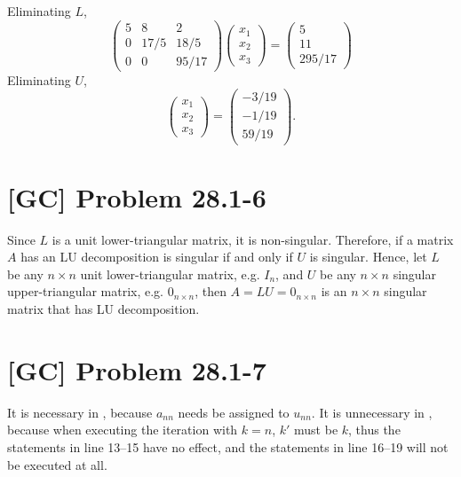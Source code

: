 \documentclass[a4paper,11pt]{article}
\begin{document}
  Eliminating $L$,
  $$ \begin{pmatrix}
       5 & 8 & 2 \\
       0 & 17/5 & 18/5 \\
       0 & 0 & 95/17
     \end{pmatrix}
     \begin{pmatrix} x_1 \\ x_2 \\ x_3 \end{pmatrix}
     =
     \begin{pmatrix} 5 \\ 11 \\ 295/17 \end{pmatrix} $$
  Eliminating $U$,
  $$ \begin{pmatrix} x_1 \\ x_2 \\ x_3 \end{pmatrix}
     =
     \begin{pmatrix} -3/19 \\ -1/19 \\ 59/19 \end{pmatrix}. $$

  \section{[GC] Problem 28.1-6}
  Since $L$ is a unit lower-triangular matrix, it is non-singular. Therefore, if a matrix $A$ has an LU decomposition is singular if and only if $U$ is singular. Hence, let $L$ be any $n \times n$ unit lower-triangular matrix, e.g. $I_n$, and $U$ be any $n \times n$ singular upper-triangular matrix, e.g. $0_{n \times n}$, then $A=LU=0_{n \times n}$ is an $n \times n$ singular matrix that has LU decomposition.

  \section{[GC] Problem 28.1-7}
  It is necessary in , because $a_{nn}$ needs be assigned to $u_{nn}$.
  It is unnecessary in , because when executing the \For iteration with $k = n$, $k'$ must be $k$, thus the statements in line 13--15 have no effect, and the statements in line 16--19 will not be executed at all.
\end{document}
